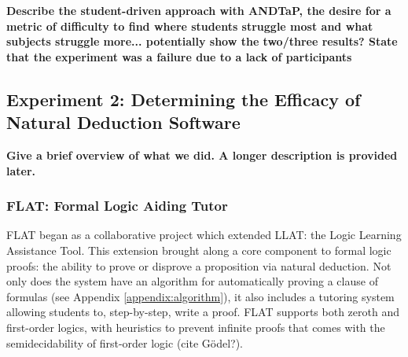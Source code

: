 \documentclass[ms]{uncgdissertationexp2}
\theoremstyle{plain}
\theoremstyle{definition}
\theoremstyle{remark}
\begin{document}
\textbf{Describe the student-driven approach with ANDTaP, the desire for a metric of difficulty to find where students struggle most and what subjects struggle more... potentially show the two/three results? State that the experiment was a failure due to a lack of participants}

\subsection{Experiment 2: Determining the Efficacy of Natural Deduction Software}

\textbf{Give a brief overview of what we did. A longer description is provided later.}

\subsubsection{FLAT: Formal Logic Aiding Tutor}
FLAT began as a collaborative project which extended LLAT: the Logic Learning Assistance Tool. This extension brought along a core component to formal logic proofs: the ability to prove or disprove a proposition via natural deduction. Not only does the system have an algorithm for automatically proving a clause of formulas (see Appendix \ref{appendix:algorithm}), it also includes a tutoring system allowing students to, step-by-step, write a proof. FLAT supports both zeroth and first-order logics, with heuristics to prevent infinite proofs that comes with the semidecidability of first-order logic (cite G\"odel?).
\end{document}
